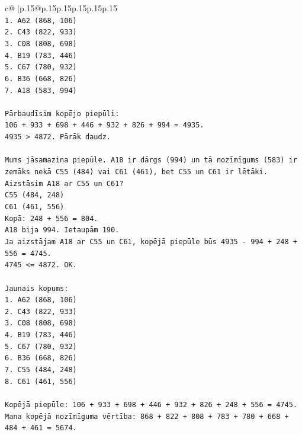\documentclass{article}
\begin{document}
{\begin{supertabular}{c@{$\;$}|p{.15\linewidth}@{}p{.15\linewidth}p{.15\linewidth}p{.15\linewidth}p{.15\linewidth}p{.15\linewidth}}
{{{\\ 
\texttt{1. A62 (868, 106)} \\
\texttt{2. C43 (822, 933)} \\
\texttt{3. C08 (808, 698)} \\
\texttt{4. B19 (783, 446)} \\
\texttt{5. C67 (780, 932)} \\
\texttt{6. B36 (668, 826)} \\
\texttt{7. A18 (583, 994)} \\
\\ 
\texttt{Pārbaudīsim kopējo piepūli:} \\
\texttt{106 + 933 + 698 + 446 + 932 + 826 + 994 = 4935.} \\
\texttt{4935 > 4872. Pārāk daudz.} \\
\\ 
\texttt{Mums jāsamazina piepūle. A18 ir dārgs (994) un tā nozīmīgums (583) ir zemāks nekā C55 (484) vai C61 (461), bet C55 un C61 ir lētāki.} \\
\texttt{Aizstāsim A18 ar C55 un C61?} \\
\texttt{C55 (484, 248)} \\
\texttt{C61 (461, 556)} \\
\texttt{Kopā: 248 + 556 = 804.} \\
\texttt{A18 bija 994. Ietaupām 190.} \\
\texttt{Ja aizstājam A18 ar C55 un C61, kopējā piepūle būs 4935 {-} 994 + 248 + 556 = 4745.} \\
\texttt{4745 <= 4872. OK.} \\
\\ 
\texttt{Jaunais kopums:} \\
\texttt{1. A62 (868, 106)} \\
\texttt{2. C43 (822, 933)} \\
\texttt{3. C08 (808, 698)} \\
\texttt{4. B19 (783, 446)} \\
\texttt{5. C67 (780, 932)} \\
\texttt{6. B36 (668, 826)} \\
\texttt{7. C55 (484, 248)} \\
\texttt{8. C61 (461, 556)} \\
\\ 
\texttt{Kopējā piepūle: 106 + 933 + 698 + 446 + 932 + 826 + 248 + 556 = 4745.} \\
\texttt{Mana kopējā nozīmīguma vērtība: 868 + 822 + 808 + 783 + 780 + 668 + 484 + 461 = 5674.} \\
}}}
\end{supertabular}}
\end{document}
